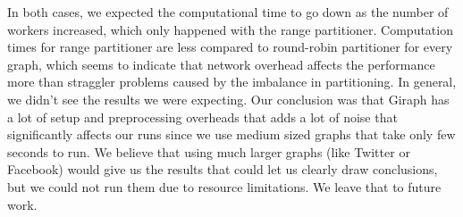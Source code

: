 In both cases, we expected the computational time to go down as the number of workers increased, 
which only happened with the range partitioner. Computation times for range partitioner are less 
compared to round-robin partitioner for every graph, which seems to indicate that network overhead 
affects the performance more than straggler problems caused by the imbalance in partitioning.
In general, we didn't see the results we were expecting. Our conclusion was that Giraph has a 
lot of setup and preprocessing overheads that adds a lot of 
noise that significantly affects our runs since we use medium sized graphs that take only few seconds 
to run. We believe that 
using much larger graphs (like Twitter or Facebook) would give us the results that could let us 
clearly draw conclusions, but we could not run them due to resource limitations. We leave that to 
future work.
